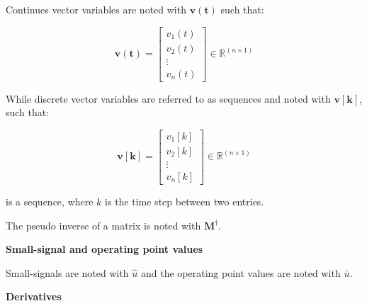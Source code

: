 




Continues vector variables are noted with $\bm{v(t)}$ such that:

\begin{equation}
\bm{v(t)} = 
\begin{bmatrix}

		 v_1(t) 	\\
		 v_2(t)	\\
		 \vdots \\
		 v_n(t)

\end{bmatrix}
\in \pmb{{\mathbb{R}}}^{(n \times 1)}
\end{equation}

While discrete vector variables are referred to as sequences and noted with $\bm{v[k]}$, such that:

\begin{equation}
\bm{v[k]} = 
\begin{bmatrix}

		 v_1[k] 	\\
		 v_2[k]	\\
		 \vdots \\
		 v_n[k]

\end{bmatrix}
\in \pmb{{\mathbb{R}}}^{(n \times 1)}
\end{equation}

is a sequence, where $k$ is the time step between two entries.

The pseudo inverse of a matrix is noted with $\bm{{M}^{\dagger}}$.

 \textbf{Small-signal and operating point values}

Small-signals are noted with $\hat{u}$ and the operating point values are noted with $\bar{u}$.

 \textbf{Derivatives}

